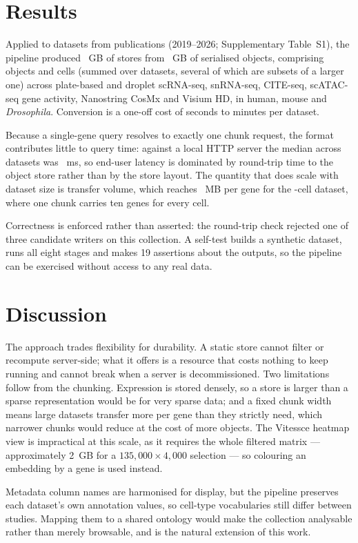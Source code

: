 \section{Results}

Applied to \NumDatasets{} datasets from \NumPublications{} publications
(2019--2026; Supplementary Table~S1), the pipeline produced \StoreSize{}~GB
of stores from \SourceSize{}~GB of serialised objects, comprising
\NumObjects{} objects and \NumCells{} cells (summed over datasets, several of
which are subsets of a larger one) across plate-based and droplet scRNA-seq,
snRNA-seq, CITE-seq, scATAC-seq gene activity, Nanostring CosMx and Visium HD,
in human, mouse and \textit{Drosophila}. Conversion is a one-off cost of
seconds to minutes per dataset.

Because a single-gene query resolves to exactly one chunk request, the
format contributes little to query time: against a local HTTP server the median
across datasets was \MedianPfifty{}~ms, so end-user latency is dominated by
round-trip time to the object store rather than by the store layout. The
quantity that does scale with dataset size is transfer volume, which reaches
\MaxKbPerGene{}~MB per gene for the \BiggestCells{}-cell dataset, where one
chunk carries ten genes for every cell.

Correctness is enforced rather than asserted: the round-trip check rejected one
of three candidate writers on this collection. A self-test builds a synthetic
dataset, runs all eight stages and makes 19 assertions about the outputs, so the
pipeline can be exercised without access to any real data.

\section{Discussion}

The approach trades flexibility for durability. A static store cannot filter or
recompute server-side; what it offers is a resource that costs nothing to keep
running and cannot break when a server is decommissioned. Two limitations follow
from the chunking. Expression is stored densely, so a store is larger than a
sparse representation would be for very sparse data; and a fixed chunk width
means large datasets transfer more per gene than they strictly need, which
narrower chunks would reduce at the cost of more objects. The Vitessce heatmap
view is impractical at this scale, as it requires the whole filtered matrix ---
approximately 2~GB for a $135{,}000 \times 4{,}000$ selection --- so colouring
an embedding by a gene is used instead.

Metadata column names are harmonised for display, but the pipeline preserves
each dataset's own annotation values, so cell-type vocabularies still differ
between studies. Mapping them to a shared ontology would make the collection
analysable rather than merely browsable, and is the natural extension of this
work.

